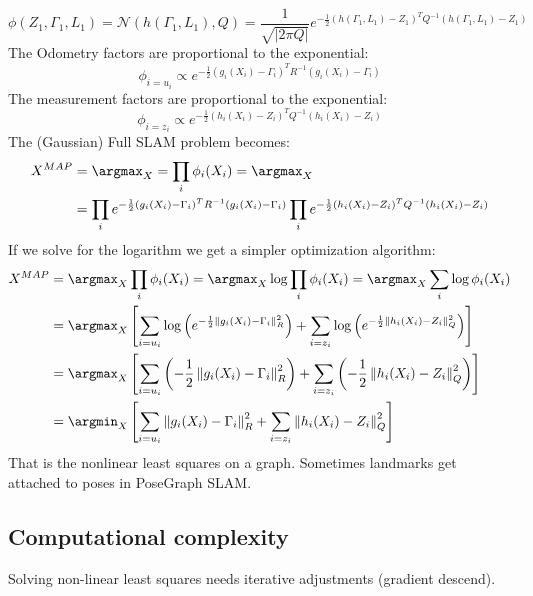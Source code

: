\[\phi(Z_1, \Gamma_1, L_1)= \mathcal{N}(h(\Gamma_1,L_1),Q) =\dfrac{1}{\sqrt{\left\lvert 2\pi Q\right\rvert}}e^{-\frac{1}{2}(h(\Gamma_1,L_1)-Z_1)^TQ^{-1}(h(\Gamma_1,L_1)-Z_1)}\]
The Odometry factors are proportional to the exponential: 
\[\phi_{i=u_i}\propto e^{-\frac{1}{2}(g_i(X_i)-\Gamma_i)^TR^{-1}(g_i(X_i)-\Gamma_i)}\]
The measurement factors are proportional to the exponential: 
\[\phi_{i=z_i}\propto e^{-\frac{1}{2}(h_i(X_i)-Z_i)^TQ^{-1}(h_i(X_i)-Z_i)}\]
The (Gaussian) Full SLAM problem becomes: 
\begin{align*}
    X^{MAP} &=\argmax_{X}=\prod_i\phi_i(X_i)=\argmax_{X} \\
            &=\prod_ie^{-\frac{1}{2}(g_i(X_i)-\Gamma_i)^TR^{-1}(g_i(X_i)-\Gamma_i)}\prod_ie^{-\frac{1}{2}(h_i(X_i)-Z_i)^TQ^{-1}(h_i(X_i)-Z_i)}
\end{align*}
If we solve for the logarithm we get a simpler optimization algorithm: 
\begin{align*}
    X^{MAP} &=\argmax_X\prod_i\phi_i(X_i)=\argmax_X\log\prod_i\phi_i(X_i)=\argmax_X\sum_i\log\phi_i(X_i)\\
            &=\argmax_X\left[\sum_{i=u_i}\log\left(e^{-\frac{1}{2}\left\lVert g_i(X_i)-\Gamma_i\right\rVert _R^2}\right)+\sum_{i=z_i}\log\left(e^{-\frac{1}{2}\left\lVert h_i(X_i)-Z_i\right\rVert _Q^2}\right)\right] \\
            &=\argmax_X\left[\sum_{i=u_i}\left(-\dfrac{1}{2}\left\lVert g_i(X_i)-\Gamma_i\right\rVert _R^2\right)+\sum_{i=z_i}\left(-\frac{1}{2}\left\lVert h_i(X_i)-Z_i\right\rVert _Q^2\right)\right] \\
            &=\argmin_X\left[\sum_{i=u_i}\left\lVert g_i(X_i)-\Gamma_i\right\rVert _R^2 +\sum_{i=z_i}\left\lVert h_i(X_i)-Z_i\right\rVert _Q^2\right] 
\end{align*}
That is the nonlinear least squares on a graph. 
Sometimes landmarks get attached to poses in PoseGraph SLAM.

\subsection{Computational complexity}
Solving non-linear least squares needs iterative adjustments (gradient descend). 

